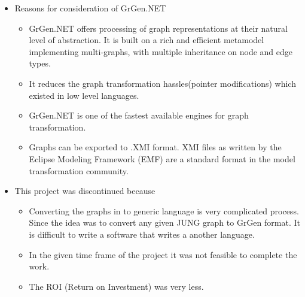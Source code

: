 \begin{itemize}

\item {Reasons for consideration of GrGen.NET}
 
\begin{itemize}
\item GrGen.NET offers processing of graph representations at their natural level of abstraction. It is built on a rich and efficient metamodel implementing multi-graphs, with multiple inheritance on node and edge types. 

\item It reduces the graph transformation hassles(pointer modifications) which existed in low level languages.

\item GrGen.NET is one of the fastest available engines for graph transformation. 

\item Graphs can be exported to .XMI format. XMI files as written by the Eclipse Modeling Framework (EMF) are a standard format in the model transformation community.
\end{itemize}

\item{This project was discontinued because}
\begin{itemize}
\item Converting the graphs in to generic language is very complicated process. Since the idea was to convert any given JUNG graph to GrGen format. It is difficult to write a software that writes a another language. 

\item In the given time frame of the project it was not feasible to complete the work. 

\item The ROI (Return on Investment) was very less.  
\end{itemize}
\end{itemize}



